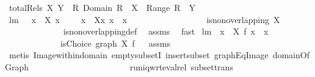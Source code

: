 \begin{isabellebody}
\isamarkupfalse%
\ {\isachardoublequoteopen}totalRels\ X\ Y\ {\isacharequal}{\isacharequal}\ {\isacharbraceleft}R{\isachardot}\ Domain\ R\ {\isacharequal}\ X\ {\isacharampersand}\ Range\ R\ {\isasymsubseteq}\ Y{\isacharbraceright}{\isachardoublequoteclose}%
\isamarkuptrue%
\isamarkupfalse%
\ lm{}{}{\isacharcolon}\ \ {\isachardoublequoteopen}{\isasymforall}\ x{}\ {\isasymin}\ X{\isachardot}\ {\isacharparenleft}x{}\ {\isasymnoteq}\ {\isacharbraceleft}{\isacharbraceright}\ {\isacharampersand}\ {\isacharparenleft}{\isasymforall}\ x{}\ {\isasymin}\ X{\isacharminus}{\isacharbraceleft}x{}{\isacharbraceright}{\isachardot}\ x{}\ {\isasyminter}\ x{}\ \ {\isacharequal}\ \ {\isacharbraceleft}{\isacharbraceright}{\isacharparenright}{\isacharparenright}{\isachardoublequoteclose}\ \isanewline
\ \ \ \ \ \ \ \ \ \ \ \ \ {\isachardoublequoteopen}is{\isacharunderscore}non{\isacharunderscore}overlapping\ X{\isachardoublequoteclose}\ \isanewline
%
\isadelimproof
\ \ \ \ \ \ \ \ \ \ \ \ %
\endisadelimproof
%
\isatagproof
{}\isamarkupfalse%
\ is{\isacharunderscore}non{\isacharunderscore}overlapping{\isacharunderscore}def\ \isamarkupfalse%
\ assms\ \isamarkupfalse%
\ fast%
\endisatagproof
{\isafoldproof}%
%
\isadelimproof
\isanewline
%
\endisadelimproof
\isanewline
{}\isamarkupfalse%
\ lm{}{}{\isacharcolon}\ \ {\isachardoublequoteopen}{\isasymforall}x\ {\isasymin}\ X{\isachardot}\ f\ x\ {\isasymin}\ x{\isachardoublequoteclose}\ \isanewline
\ \ \ \ \ \ \ \ \ \ \ \ \ {\isachardoublequoteopen}isChoice\ {\isacharparenleft}graph\ X\ f{\isacharparenright}{\isachardoublequoteclose}%
\isadelimproof
\ %
\endisadelimproof
%
\isatagproof
{}\isamarkupfalse%
\ assms\isanewline
\ \ \ \ \ \ \ \ \ \ \ \ \isamarkupfalse%
\ {\isacharparenleft}metis\ Image{\isacharunderscore}within{\isacharunderscore}domain{\isacharprime}\ empty{\isacharunderscore}subsetI\ insert{\isacharunderscore}subset\ graphEqImage\ domainOfGraph\ \isanewline
\ \ \ \ \ \ \ \ \ \ \ \ \ \ \ \ \ \ \ \ \ \ runiq{\isacharunderscore}wrt{\isacharunderscore}eval{\isacharunderscore}rel\ subset{\isacharunderscore}trans{\isacharparenright}%
\endisatagproof
{\isafoldproof}%
%
\isadelimproof
%
\endisadelimproof
\isanewline
\isanewline

\end{isabellebody}
